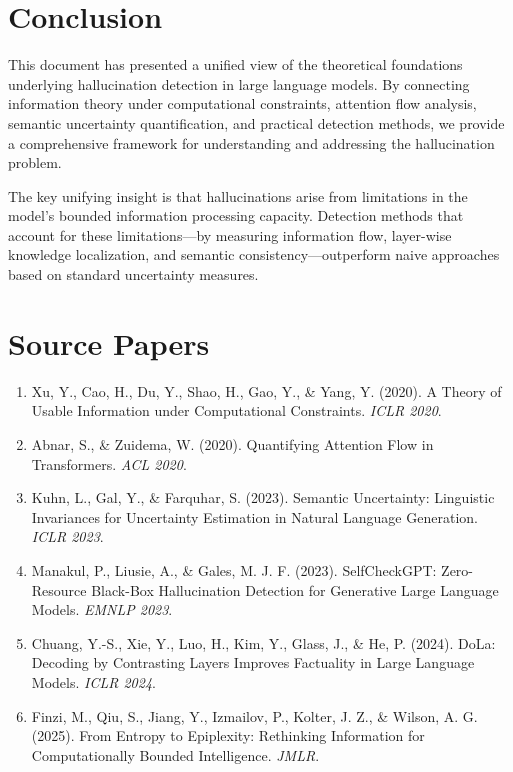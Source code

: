 \documentclass[11pt]{article}
\begin{document}
\section{Conclusion}

This document has presented a unified view of the theoretical foundations underlying hallucination detection in large language models. By connecting information theory under computational constraints, attention flow analysis, semantic uncertainty quantification, and practical detection methods, we provide a comprehensive framework for understanding and addressing the hallucination problem.

The key unifying insight is that hallucinations arise from limitations in the model's bounded information processing capacity. Detection methods that account for these limitations---by measuring information flow, layer-wise knowledge localization, and semantic consistency---outperform naive approaches based on standard uncertainty measures.


\section*{Source Papers}

\begin{enumerate}
    \item Xu, Y., Cao, H., Du, Y., Shao, H., Gao, Y., \& Yang, Y. (2020). A Theory of Usable Information under Computational Constraints. \textit{ICLR 2020}.

    \item Abnar, S., \& Zuidema, W. (2020). Quantifying Attention Flow in Transformers. \textit{ACL 2020}.

    \item Kuhn, L., Gal, Y., \& Farquhar, S. (2023). Semantic Uncertainty: Linguistic Invariances for Uncertainty Estimation in Natural Language Generation. \textit{ICLR 2023}.

    \item Manakul, P., Liusie, A., \& Gales, M. J. F. (2023). SelfCheckGPT: Zero-Resource Black-Box Hallucination Detection for Generative Large Language Models. \textit{EMNLP 2023}.

    \item Chuang, Y.-S., Xie, Y., Luo, H., Kim, Y., Glass, J., \& He, P. (2024). DoLa: Decoding by Contrasting Layers Improves Factuality in Large Language Models. \textit{ICLR 2024}.

    \item Finzi, M., Qiu, S., Jiang, Y., Izmailov, P., Kolter, J. Z., \& Wilson, A. G. (2025). From Entropy to Epiplexity: Rethinking Information for Computationally Bounded Intelligence. \textit{JMLR}.
\end{enumerate}
\end{document}
